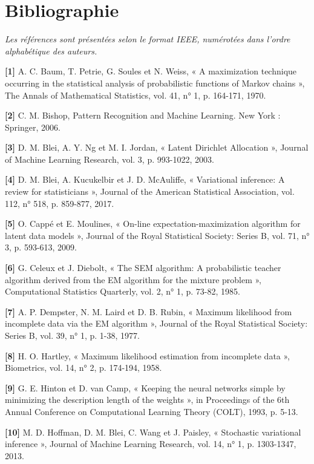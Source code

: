 \chapter*{Bibliographie}
\emph{Les références sont présentées selon le format IEEE, numérotées dans l'ordre alphabétique des auteurs.}

\textbf{[1]  }A. C. Baum, T. Petrie, G. Soules et N. Weiss, « A maximization technique occurring in the statistical analysis of probabilistic functions of Markov chains », The Annals of Mathematical Statistics, vol. 41, n° 1, p. 164-171, 1970.

\textbf{[2]  }C. M. Bishop, Pattern Recognition and Machine Learning. New York : Springer, 2006.

\textbf{[3]  }D. M. Blei, A. Y. Ng et M. I. Jordan, « Latent Dirichlet Allocation », Journal of Machine Learning Research, vol. 3, p. 993-1022, 2003.

\textbf{[4]  }D. M. Blei, A. Kucukelbir et J. D. McAuliffe, « Variational inference: A review for statisticians », Journal of the American Statistical Association, vol. 112, n° 518, p. 859-877, 2017.

\textbf{[5]  }O. Cappé et E. Moulines, « On-line expectation-maximization algorithm for latent data models », Journal of the Royal Statistical Society: Series B, vol. 71, n° 3, p. 593-613, 2009.

\textbf{[6]  }G. Celeux et J. Diebolt, « The SEM algorithm: A probabilistic teacher algorithm derived from the EM algorithm for the mixture problem », Computational Statistics Quarterly, vol. 2, n° 1, p. 73-82, 1985.

\textbf{[7]  }A. P. Dempster, N. M. Laird et D. B. Rubin, « Maximum likelihood from incomplete data via the EM algorithm », Journal of the Royal Statistical Society: Series B, vol. 39, n° 1, p. 1-38, 1977.

\textbf{[8]  }H. O. Hartley, « Maximum likelihood estimation from incomplete data », Biometrics, vol. 14, n° 2, p. 174-194, 1958.

\textbf{[9]  }G. E. Hinton et D. van Camp, « Keeping the neural networks simple by minimizing the description length of the weights », in Proceedings of the 6th Annual Conference on Computational Learning Theory (COLT), 1993, p. 5-13.

\textbf{[10]  }M. D. Hoffman, D. M. Blei, C. Wang et J. Paisley, « Stochastic variational inference », Journal of Machine Learning Research, vol. 14, n° 1, p. 1303-1347, 2013.

